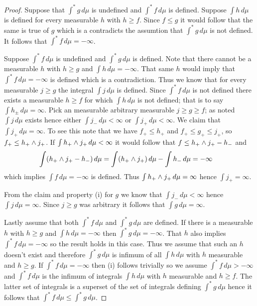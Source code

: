 \begin{proof}
Suppose that $\int^* g \, d\mu$ is undefined and $\int^* f \, d\mu$ is defined.  Suppose $\int h \, d\mu$ is defined for every measurable $h$ with $h \geq f$. Since $f \leq g$ it would follow that the same is true of $g$ which is a contradicts the assumtion that $\int^* g \, d\mu$ is not defined.  It follows that $\int^* f \, d\mu = -\infty$.  
 
Suppose $\int^* f \, d\mu$ is undefined and $\int^* g \, d\mu$ is defined.  Note that there cannot be a measurable $h$ with $h \geq g$ and $\int h \, d\mu = -\infty$.  That same $h$ would imply that $\int^* f \, d\mu = -\infty$ is defined which is a contradiction.  Thus we know that for every measurable $j \geq g$ the integral $\int j \, d\mu$ is defined.  Since $\int^* f \, d\mu$ is not defined there exists a measurable $h \geq f$ for which $\int h \, d\mu$ is not defined; that is to say $\int h_\pm \, d\mu = \infty$.  Pick an measurable arbitrary measurable $j \geq g \geq f$; as noted $\int j \, d\mu$ exists hence either $\int j_- \, d\mu<\infty$ or $\int j_+ \, d\mu<\infty$.  We claim that $\int j_+ \, d\mu = \infty$.  
To see this note that we have $f_+ \leq h_+$ and $f_+ \leq g_+ \leq j_+$, so $f_+ \leq h_+ \wedge j_+$.  If $\int h_+ \wedge j_+ \, d\mu < \infty$ it would follow that $f \leq h_+ \wedge j_+ - h_-$ and 
\begin{align*}
\int (h_+ \wedge j_+ - h_-) \, d\mu &= \int  (h_+ \wedge j_+) \, d\mu  - \int  h_- \, d\mu = -\infty
\end{align*} 
which implies $\int f \, d\mu=-\infty$ is defined.  Thus $\int h_+ \wedge j_+ \, d\mu = \infty$ hence $\int j_+ = \infty$.  

From the claim and property (i) for $g$ we know that $\int j_- \, d\mu < \infty$ hence $\int j \, d\mu = \infty$.  Since $j \geq g$ was arbitrary it follows that $\int g \, d\mu = \infty$.

Lastly assume that both $\int^* f \, d\mu$ and $\int^* g \, d\mu$ are defined.  If there is a measurable $h$ with $h \geq g$ and $\int h \, d\mu = -\infty$ then $\int^* g \, d\mu = -\infty$.  That $h$ also implies $\int^* f \, d\mu=-\infty$ so the result holds in this case.  Thus we assume that such an $h$ doesn't exist and therefore $\int^* g \, d\mu$ is infimum of all $\int h \, d\mu$ with $h$ measurable and $h \geq g$.  If $\int^* f \, d\mu=-\infty$ then (i) follows trivially so we assume $\int^* f \, d\mu > -\infty$ and 
$\int^* f \, d\mu$ is the infimum of integrals $\int h \, d\mu$ with $h$ measurable and $h \geq f$.  The latter set of integrals is a superset of the set of integrals defining $\int^* g \, d\mu$ hence it follows that $\int^* f \, d\mu \leq \int^* g \, d\mu$.
\end{proof}


